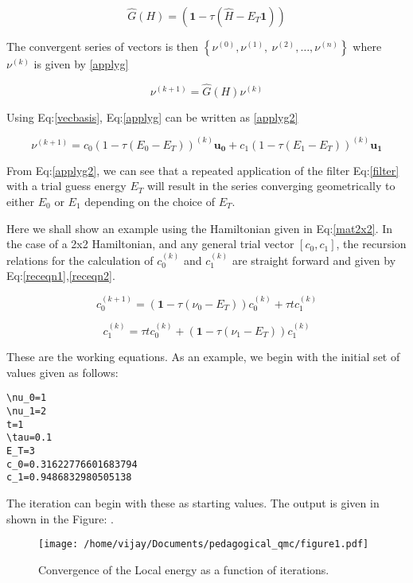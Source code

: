 \documentclass[11pt]{article}
\begin{document}
\begin{equation}
\label{filter}
\hat{G}(H) = \left ( \mathbf{1} - \tau (\hat{H} - E_T\mathbf{1}) \right)
\end{equation}

The convergent series of vectors is then \(\left\{ \nu^{(0)},  \nu^{(1)},\
\nu^{(2)},\dots,\nu^{(n)}\right\}\) where \(\nu^{(k)}\) is given by \ref{applyg}

\begin{equation}
\label{applyg}
\nu^{(k+1)} = \hat{G}(H)\nu^{(k)}
\end{equation}

Using Eq:\ref{vecbasis}, Eq:\ref{applyg} can be written as \ref{applyg2}

\begin{equation}
\label{applyg2}
\nu^{(k+1)} = c_0 (1-\tau(E_0-E_T))^{(k)}\mathbf{u_0} + c_1 (1-\tau(E_1-E_T))^{(k)}\mathbf{u_1}
\end{equation}

From Eq:\ref{applyg2}, we can see that a repeated application of the filter Eq:\ref{filter}
with a trial guess energy \(E_T\) will result in the series converging
geometrically to either \(E_0\) or \(E_1\) depending on the choice of \(E_T\).

Here we shall show an example using the Hamiltonian given in Eq:\ref{mat2x2}. In the
case of a 2x2 Hamiltonian, and any general trial vector \([c_0,c_1]\), the
recursion relations for the calculation of \(c^{(k)}_0\) and \(c^{(k)}_1\) are
straight forward and given by Eq:\ref{receqn1},\ref{receqn2}.

\begin{equation}
\label{receqn1}
c^{(k+1)}_0 =  \left(\mathbf{1}-\tau\left(\nu_0 - E_T\right)\right)c^{(k)}_0 + \tau t c^{(k)}_1
\end{equation}

\begin{equation}
\label{receqn2}
c^{(k)}_1 = \tau t c^{(k)}_0 + \left(\mathbf{1}-\tau\left(\nu_1 - E_T\right)\right)c^{(k)}_1
\end{equation}

These are the working equations. As an example, we begin with the initial set of
values given as follows:

\begin{verbatim}
\nu_0=1
\nu_1=2
t=1
\tau=0.1
E_T=3
c_0=0.31622776601683794
c_1=0.9486832980505138
\end{verbatim}

The iteration can begin with these as starting values. The output is given in
shown in the Figure: .

\begin{figure}[htbp]
\centering
\texttt{[image: /home/vijay/Documents/pedagogical\_qmc/figure1.pdf]}
\caption{\label{figure1}Convergence of the Local energy as a function of iterations.}
\end{figure}
\end{document}
